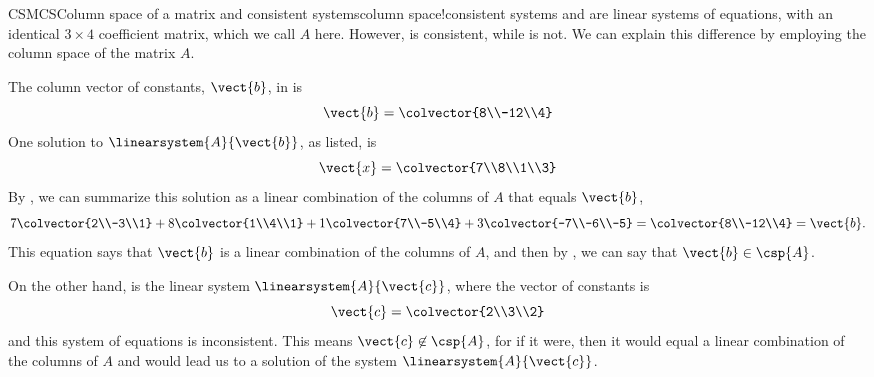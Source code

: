 \begin{example}{CSMCS}{Column space of a matrix and consistent systems}{column space!consistent systems}
 and  are linear systems of equations, with an identical $3\times 4$ coefficient matrix, which we call $A$ here.  However,  is consistent, while  is not.  We can explain this difference by employing the column space of the matrix $A$.\par
%
The column vector of constants, $\vect{b}$, in  is
%
\begin{equation*}
\vect{b}=\colvector{8\\-12\\4}
\end{equation*}
%
One solution to $\linearsystem{A}{\vect{b}}$, as listed, is
%
\begin{equation*}
\vect{x}=\colvector{7\\8\\1\\3}
\end{equation*}
%
By , we can summarize this solution as a linear combination of the columns of $A$ that equals $\vect{b}$,
%
\begin{equation*}
7\colvector{2\\-3\\1}+
8\colvector{1\\4\\1}+
1\colvector{7\\-5\\4}+
3\colvector{-7\\-6\\-5}=
\colvector{8\\-12\\4}=\vect{b}.
\end{equation*}
%
This equation says that $\vect{b}$ is a linear combination of the columns of $A$, and then by , we can say that $\vect{b}\in\csp{A}$.\par
%
On the other hand,  is the linear system $\linearsystem{A}{\vect{c}}$, where the vector of constants is
%
\begin{equation*}
\vect{c}=\colvector{2\\3\\2}
\end{equation*}
%
and this system of equations is inconsistent.  This means $\vect{c}\not\in\csp{A}$, for if it were, then it would equal a linear combination of the columns of $A$ and  would lead us to a solution of the system $\linearsystem{A}{\vect{c}}$.
%
\end{example}
